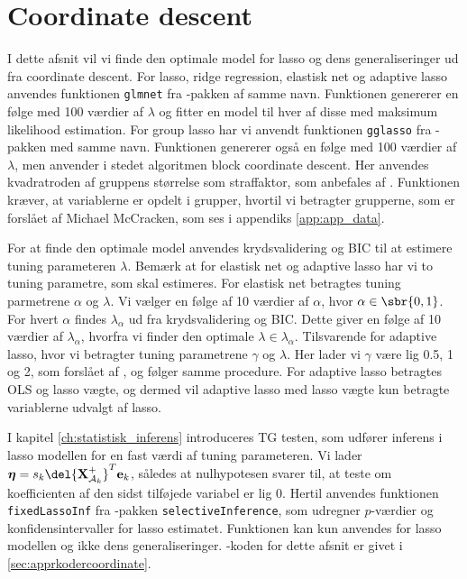 \section{Coordinate descent}
I dette afsnit vil vi finde den optimale model for lasso og dens generaliseringer ud fra coordinate descent.
For lasso, ridge regression, elastisk net og adaptive lasso anvendes funktionen \texttt{glmnet} fra \Rlang-pakken af samme navn.
Funktionen genererer en følge med 100 værdier af $\lambda$ og fitter en model til hver af disse med maksimum likelihood estimation.
For group lasso har vi anvendt funktionen \texttt{gglasso} fra \Rlang-pakken med samme navn. 
Funktionen genererer også en følge med 100 værdier af $\lambda$, men anvender i stedet algoritmen block coordinate descent. 
Her anvendes kvadratroden af gruppens størrelse som straffaktor, som anbefales af \citep{group_lasso}.
Funktionen kræver, at variablerne er opdelt i grupper, hvortil vi betragter grupperne, som er forslået af Michael McCracken, som ses i appendiks \ref{app:app_data}. 

For at finde den optimale model anvendes krydsvalidering og BIC til at estimere tuning parameteren $\lambda$.
Bemærk at for elastisk net og adaptive lasso har vi to tuning parametre, som skal estimeres. 
For elastisk net betragtes tuning parmetrene $\alpha$ og $\lambda$.
Vi vælger en følge af 10 værdier af \(\alpha\), hvor $\alpha \in \sbr{0,1}$.
For hvert \(\alpha\) findes \(\lambda_\alpha\) ud fra krydsvalidering og BIC.
Dette giver en følge af 10 værdier af \(\lambda_\alpha\), hvorfra vi finder den optimale \(\lambda \in \lambda_\alpha\).
Tilsvarende for adaptive lasso, hvor vi betragter tuning parametrene $\gamma$ og $\lambda$.
Her lader vi $\gamma$ være lig 0.5, 1 og 2, som forslået af \citep{adaptive_lasso}, og følger samme procedure.
For adaptive lasso betragtes OLS og lasso vægte, og dermed vil adaptive lasso med lasso vægte kun betragte variablerne udvalgt af lasso.

I kapitel \ref{ch:statistisk_inferens} introduceres TG testen, som udfører inferens i lasso modellen for en fast værdi af tuning parameteren.
Vi lader $\boldsymbol{\eta} = s_k \del{\textbf{X}^+_{\mathcal{A}_k}}^T \mathbf{e}_k$, således at nulhypotesen svarer til, at teste om koefficienten af den sidst tilføjede variabel er lig 0.
Hertil anvendes funktionen \texttt{fixedLassoInf} fra \Rlang-pakken \texttt{selectiveInference}, som udregner \(p\)-værdier og konfidensintervaller for lasso estimatet.
Funktionen kan kun anvendes for lasso modellen og ikke dens generaliseringer. 
\Rlang-koden for dette afsnit er givet i  \ref{sec:apprkodercoordinate}.





